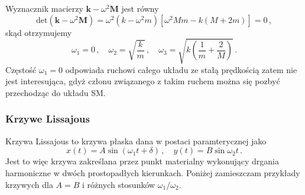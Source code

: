 \documentclass[../main.tex]{subfiles}
\begin{document}
        Wyznacznik macierzy \(\mathbf{k}-\omega^2\mathbf{M}\) jest równy
        \begin{equation*}
            \text{det}(\mathbf{k}-\omega^2\mathbf{M})=\omega^2(k-\omega^2m)\left[\omega^2Mm-k(M+2m)\right]=0\,,
        \end{equation*}
        skąd otrzymujemy
        \begin{equation*}
            \omega_1=0\,,\quad\omega_2=\sqrt{\frac{k}{m}}\,,\quad\omega_3=\sqrt{k\left(\frac{1}{m}+\frac{2}{M}\right)}\,.
        \end{equation*}
        Częstość \(\omega_1=0\) odpowiada ruchowi całego układu ze stałą prędkością zatem nie jest interesująca, gdyż członu związanego z takim ruchem można się pozbyć przechodząc do układu SM.
        \subsubsection{Krzywe Lissajous}
        Krzywa Lissajous to krzywa płaska dana w postaci paramterycznej jako
        \begin{equation*}
            x(t)=A\sin(\omega_1t+\delta)\,,\quad y(t)=B\sin\omega_2t\,.
        \end{equation*}
        Jest to więc krzywa zakreślana przez punkt materialny wykonujący drgania harmoniczne w dwóch prostopadłych kierunkach. Poniżej zamieszczam przykłady krzywych dla \(A=B\) i różnych stosunków \(\omega_1/\omega_2\).
        
\end{document}
